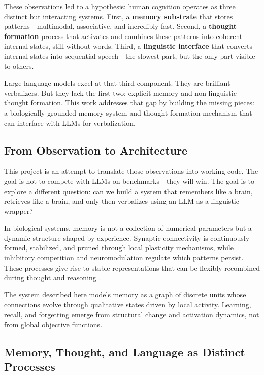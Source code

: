 \documentclass[11pt]{article}
\begin{document}
These observations led to a hypothesis: human cognition operates as three distinct but interacting systems. First, a \textbf{memory substrate} that stores patterns---multimodal, associative, and incredibly fast. Second, a \textbf{thought formation} process that activates and combines these patterns into coherent internal states, still without words. Third, a \textbf{linguistic interface} that converts internal states into sequential speech---the slowest part, but the only part visible to others.

Large language models excel at that third component. They are brilliant verbalizers. But they lack the first two: explicit memory and non-linguistic thought formation. This work addresses that gap by building the missing pieces: a biologically grounded memory system and thought formation mechanism that can interface with LLMs for verbalization.

\subsection{From Observation to Architecture}

This project is an attempt to translate those observations into working code. The goal is not to compete with LLMs on benchmarks---they will win. The goal is to explore a different question: can we build a system that remembers like a brain, retrieves like a brain, and only then verbalizes using an LLM as a linguistic wrapper?

In biological systems, memory is not a collection of numerical parameters but a dynamic structure shaped by experience. Synaptic connectivity is continuously formed, stabilized, and pruned through local plasticity mechanisms, while inhibitory competition and neuromodulation regulate which patterns persist. These processes give rise to stable representations that can be flexibly recombined during thought and reasoning \citep{hebb1949organization,markram1997regulation}.

The system described here models memory as a graph of discrete units whose connections evolve through qualitative states driven by local activity. Learning, recall, and forgetting emerge from structural change and activation dynamics, not from global objective functions.

\subsection{Memory, Thought, and Language as Distinct Processes}
\end{document}
